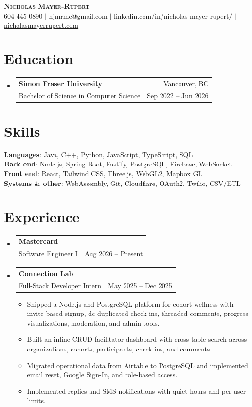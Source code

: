 \documentclass[letterpaper,11pt]{article}
\makeatletter
\newcommand{\resumeItem}[1]{
\item\small{
{#1 \vspace{-2pt}}
}
}
\newcommand{\resumeSubheading}[4]{
\vspace{-2pt}\item
\begin{tabular*}{0.97\textwidth}[t]{l@{\extracolsep{\fill}}r}
\textbf{#1} & #2 \\
\small #3 & #4 \\
\end{tabular*}\vspace{-7pt}
}
\newcommand{\resumeSubHeadingListStart}{\begin{itemize}[leftmargin=0.15in, label={}]}
\newcommand{\resumeSubHeadingListEnd}{\end{itemize}}
\newcommand{\resumeItemListStart}{\begin{itemize}}
\newcommand{\resumeItemListEnd}{\end{itemize}\vspace{-5pt}}
\makeatother
\begin{document}
\begin{center}
\textbf{\Huge \scshape Nicholas Mayer-Rupert} \\ \vspace{1pt}
\normalsize 604-445-0890 $|$ \href{mailto:njmrme@gmail.com}{\underline{njmrme@gmail.com}} $|$
\href{https://www.linkedin.com/in/nicholas-mayer-rupert/}{\underline{linkedin.com/in/nicholas-mayer-rupert/}}
 $|$ \href{https://nicholasmayerrupert.com}{\underline{nicholasmayerrupert.com}}
\end{center}

\section{Education}
\resumeSubHeadingListStart
\resumeSubheading
{Simon Fraser University}{Vancouver, BC}
{Bachelor of Science in Computer Science}{Sep 2022 -- Jun 2026}
\resumeSubHeadingListEnd

\section{Skills}
\begin{itemize}[leftmargin=0.15in, label={}]
\small{\item{
\textbf{Languages}{: Java, C++, Python, JavaScript, TypeScript, SQL} \\
\textbf{Back end}{: Node.js, Spring Boot, Fastify, PostgreSQL, Firebase, WebSocket} \\
\textbf{Front end}{: React, Tailwind CSS, Three.js, WebGL2, Mapbox GL} \\
\textbf{Systems \& other}{: WebAssembly, Git, Cloudflare, OAuth2, Twilio, CSV/ETL}
}}
\end{itemize}

\section{Experience}
\resumeSubHeadingListStart
\resumeSubheading
{Mastercard}{}
{Software Engineer I}{Aug 2026 -- Present}

\resumeSubheading
{Connection Lab}{}
{Full-Stack Developer Intern}{May 2025 -- Dec 2025}
\resumeItemListStart
\resumeItem{Shipped a Node.js and PostgreSQL platform for cohort wellness with invite-based signup, de-duplicated check-ins, threaded comments, progress visualizations, moderation, and admin tools.}
\resumeItem{Built an inline-CRUD facilitator dashboard with cross-table search across organizations, cohorts, participants, check-ins, and comments.}
\resumeItem{Migrated operational data from Airtable to PostgreSQL and implemented email reset, Google Sign-In, and role-based access.}
\resumeItem{Implemented replies and SMS notifications with quiet hours and per-user limits.}
\resumeItemListEnd
\resumeSubHeadingListEnd
\end{document}
